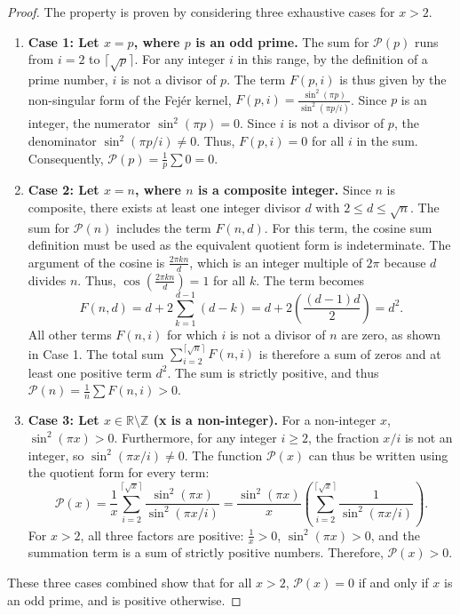 \documentclass[11pt,a4paper]{amsart}
\newcommand{\Px}{\mathcal{P}}
\theoremstyle{plain}
\theoremstyle{definition}
\begin{document}
\begin{proof}
The property is proven by considering three exhaustive cases for $x > 2$.
\begin{enumerate}
  \item \textbf{Case 1: Let $x = p$, where $p$ is an odd prime.}
  The sum for $\Px(p)$ runs from $i=2$ to $\lceil\sqrt{p}\rceil$.
  For any integer $i$ in this range, by the definition of a prime number, $i$ is not a divisor of $p$.
  The term $F(p, i)$ is thus given by the non-singular form of the Fejér kernel, $F(p, i) = \frac{\sin^2(\pi p)}{\sin^2(\pi p/i)}$.
  Since $p$ is an integer, the numerator $\sin^2(\pi p) = 0$.
  Since $i$ is not a divisor of $p$, the denominator $\sin^2(\pi p/i) \neq 0$.
  Thus, $F(p, i) = 0$ for all $i$ in the sum. Consequently, $\Px(p) = \frac{1}{p}\sum 0 = 0$.
  \item \textbf{Case 2: Let $x = n$, where $n$ is a composite integer.}
  Since $n$ is composite, there exists at least one integer divisor $d$ with $2 \le d \le \sqrt{n}$.
  The sum for $\Px(n)$ includes the term $F(n, d)$. For this term, the cosine sum definition must be used as the equivalent quotient form is indeterminate.
  The argument of the cosine is $\frac{2\pi k n}{d}$, which is an integer multiple of $2\pi$ because $d$ divides $n$.
  Thus, $\cos(\frac{2\pi k n}{d}) = 1$ for all $k$. The term becomes
  \[ F(n, d) = d + 2\sum_{k=1}^{d-1}(d-k) = d + 2\left(\frac{(d-1)d}{2}\right) = d^2.
  \]
  All other terms $F(n, i)$ for which $i$ is not a divisor of $n$ are zero, as shown in Case 1. The total sum $\sum_{i=2}^{\lceil\sqrt{n}\rceil} F(n, i)$ is therefore a sum of zeros and at least one positive term $d^2$.
  The sum is strictly positive, and thus $\Px(n) = \frac{1}{n} \sum F(n, i) > 0$.
  \item \textbf{Case 3: Let $x \in \mathbb{R} \setminus \mathbb{Z}$ (x is a non-integer).}
  For a non-integer $x$, $\sin^2(\pi x) > 0$.
  Furthermore, for any integer $i \ge 2$, the fraction $x/i$ is not an integer, so $\sin^2(\pi x/i) \neq 0$.
  The function $\Px(x)$ can thus be written using the quotient form for every term:
  \[ \Px(x) = \frac{1}{x} \sum_{i=2}^{\lceil\sqrt{x}\rceil} \frac{\sin^2(\pi x)}{\sin^2(\pi x/i)} = \frac{\sin^2(\pi x)}{x} \left( \sum_{i=2}^{\lceil\sqrt{x}\rceil} \frac{1}{\sin^2(\pi x/i)} \right).
  \]
  For $x>2$, all three factors are positive: $\frac{1}{x} > 0$, $\sin^2(\pi x) > 0$, and the summation term is a sum of strictly positive numbers.
  Therefore, $\Px(x) > 0$.
\end{enumerate}
These three cases combined show that for all $x>2$, $\Px(x)=0$ if and only if $x$ is an odd prime, and is positive otherwise.
\end{proof}
\end{document}

